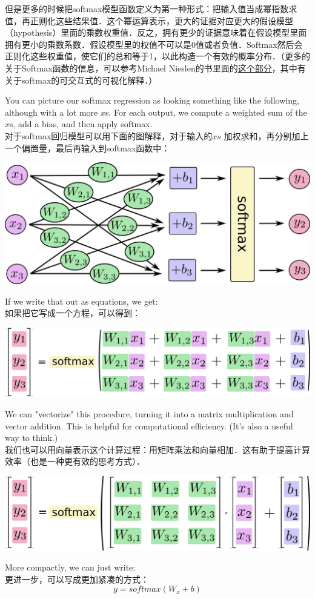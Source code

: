 但是更多的时候把softmax模型函数定义为第一种形式：把输入值当成幂指数求值，再正则化这些结果值．这个幂运算表示，更大的证据对应更大的假设模型（hypothesis）里面的乘数权重值．反之，拥有更少的证据意味着在假设模型里面拥有更小的乘数系数．假设模型里的权值不可以是0值或者负值．Softmax然后会正则化这些权重值，使它们的总和等于1，以此构造一个有效的概率分布．（更多的关于Softmax函数的信息，可以参考Michael Nieslen的书里面的\href{http://neuralnetworksanddeeplearning.com/chap3.html#softmax}{这个部分}，其中有关于softmax的可交互式的可视化解释．）

You can picture our softmax regression as looking something like the following, although with a lot more $x$s. For each output, we compute a weighted sum of the $x$s, add a bias, and then apply softmax.\\
对于softmax回归模型可以用下面的图解释，对于输入的$xs$ 加权求和，再分别加上一个偏置量，最后再输入到softmax函数中：
\begin{center}
\includegraphics[width=.65\textwidth]{../SOURCE/images/softmax-regression-scalargraph.png}
\end{center}
If we write that out as equations, we get:\\
如果把它写成一个方程，可以得到：
\begin{center}
\includegraphics[width=.68\textwidth]{../SOURCE/images/softmax-regression-scalarequation.png}
\end{center}
We can "vectorize" this procedure, turning it into a matrix multiplication and vector addition. This is helpful for computational efficiency. (It's also a useful way to think.)\\
我们也可以用向量表示这个计算过程：用矩阵乘法和向量相加．这有助于提高计算效率（也是一种更有效的思考方式）．
\begin{center}
\includegraphics[width=.68\textwidth]{../SOURCE/images/softmax-regression-vectorequation.png}
\end{center}
More compactly, we can just write:\\
更进一步，可以写成更加紧凑的方式：
\begin{equation}
y = softmax(W_x+b)
\end{equation}

